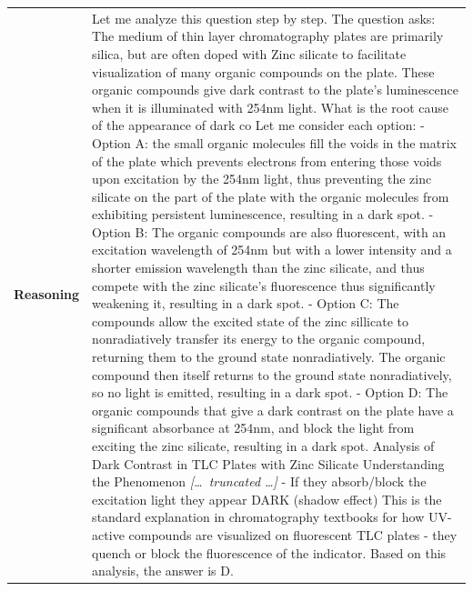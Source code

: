 \begin{longtable}{@{}l p{13cm}@{}}
  \textbf{Reasoning} & Let me analyze this question step by step. \newline The question asks: The medium of thin layer chromatography plates are primarily silica, but are often doped with Zinc silicate to facilitate visualization of many organic compounds on the plate. These organic compounds give dark contrast to the plate's luminescence when it is illuminated with 254nm light. What is the root cause of the appearance of dark co \newline Let me consider each option: \newline - Option A: the small organic molecules fill the voids in the matrix of the plate which prevents electrons from entering those voids upon excitation by the 254nm light, thus preventing the zinc silicate on the part of the plate with the organic molecules from exhibiting persistent luminescence, resulting in a dark spot. \newline - Option B: The organic compounds are also fluorescent, with an excitation wavelength of 254nm but with a lower intensity and a shorter emission wavelength than the zinc silicate, and thus compete with the zinc silicate's fluorescence thus significantly weakening it, resulting in a dark spot. \newline - Option C: The compounds allow the excited state of the zinc sillicate to nonradiatively transfer its energy to the organic compound, returning them to the ground state nonradiatively. The organic compound then itself returns to the ground state nonradiatively, so no light is emitted, resulting in a dark spot. \newline - Option D: The organic compounds that give a dark contrast on the plate have a significant absorbance at 254nm, and block the light from exciting the zinc silicate, resulting in a dark spot. \newline Analysis of Dark Contrast in TLC Plates with Zinc Silicate \newline Understanding the Phenomenon \newline \textit{[\ldots\ truncated \ldots]} \newline - If they absorb/block the excitation light they appear DARK (shadow effect) \newline This is the standard explanation in chromatography textbooks for how UV-active compounds are visualized on fluorescent TLC plates - they quench or block the fluorescence of the indicator. \newline Based on this analysis, the answer is D.  \\

\end{longtable}
